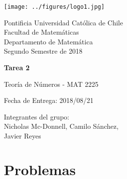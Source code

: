 


\begin{minipage}{2.5cm}
	\texttt{[image: ../figures/logo1.jpg]}
\end{minipage}
\begin{minipage}{13cm}
	\begin{flushleft}
		\raggedright
		{
			\noindent
			{\sc Pontificia Universidad Católica de Chile\\
				Facultad de Matemáticas\\
				Departamento de Matemática} \smallskip \\
			Segundo Semestre de 2018\\
		}
	\end{flushleft}
\end{minipage}

\vspace{2ex}
{\Large \centerline{\bf Tarea 2}}
{\large \centerline{Teoría de Números - MAT 2225}}
\centerline{Fecha de Entrega: 2018/08/21}

\begin{flushright}
	Integrantes del grupo:\\
	Nicholas Mc-Donnell, Camilo Sánchez,\\
	Javier Reyes
\end{flushright}

\section{Problemas}

